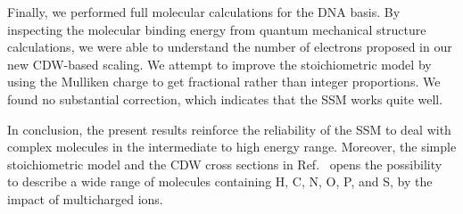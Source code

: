 \documentclass[preprint,showpacs]{revtex4}
\begin{document}
Finally, we performed full molecular calculations for the DNA basis. 
By inspecting the molecular binding energy from quantum mechanical
structure calculations, we were able to understand the number of 
electrons proposed in our new CDW-based scaling. We attempt to improve 
the stoichiometric model by using the Mulliken charge to get fractional
rather than integer proportions. We found no substantial correction,
which indicates that the SSM works quite well.

In conclusion, the present results reinforce the 
reliability of the SSM to deal with complex molecules in the intermediate
to high energy range. Moreover, the simple stoichiometric model and the 
CDW cross sections in Ref.~\cite{miraglia2019} opens the possibility to 
describe a wide range of molecules containing H, C, N, O, P, and S, by 
the impact of multicharged ions.



\bigskip
\end{document}
